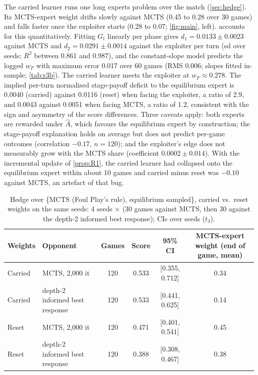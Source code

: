 \documentclass[10pt]{article}
\theoremstyle{plain}
\theoremstyle{definition}
\theoremstyle{remark}
\newcommand{\Ahat}{\hat A}
\begin{document}
The carried learner runs one long experts problem over the match (\cref{sec:hedge}). Its MCTS-expert weight drifts slowly against MCTS (0.45 to 0.28 over 30 games) and falls faster once the exploiter starts (0.28 to 0.07; \cref{fig:main}, left).  accounts for this quantitatively. Fitting $G_t$ linearly per phase gives $d_1=0.0133\pm0.0023$ against MCTS and $d_2=0.0291\pm0.0014$ against the exploiter per turn (sd over seeds; $R^2$ between 0.861 and 0.987), and the constant-slope model predicts the logged $w_F$ with maximum error 0.017 over 60 games (RMS 0.006; slopes fitted in-sample; \cref{tab:r3b}). The carried learner meets the exploiter at $w_F\approx0.278$. The implied per-turn normalised stage-payoff deficit to the equilibrium expert is 0.0040 (carried) against 0.0116 (reset) when facing the exploiter, a ratio of 2.9, and 0.0043 against 0.0051 when facing MCTS, a ratio of 1.2, consistent with the sign and asymmetry of the score differences. Three caveats apply: both experts are rewarded under $\Ahat$, which favours the equilibrium expert by construction; the stage-payoff explanation holds on average but does not predict per-game outcomes (correlation $-0.17$, $n=120$); and the exploiter's edge does not measurably grow with the MCTS share (coefficient $0.0002\pm0.014$). With the incremental update of \cref{prop:R1}, the carried learner had collapsed onto the equilibrium expert within about 10 games and carried minus reset was $-0.10$ against MCTS, an artefact of that bug.

\begin{table}[h]
\centering\small
\caption{Hedge over \{MCTS (Foul Play's rule), equilibrium sampled\}, carried vs.\ reset weights on the same seeds: 4 seeds $\times$ (30 games against MCTS, then 30 against the depth-2 informed best response); CIs over seeds ($t_3$).}
\label{tab:hedge}
\begin{tabular}{@{}llcccc@{}}
\toprule
Weights & Opponent & Games & Score & 95\% CI & MCTS-expert weight (end of game, mean) \\
\midrule
Carried & MCTS, 2,000 it & 120 & 0.533 & [0.355, 0.712] & 0.34 \\
Carried & depth-2 informed best response & 120 & 0.533 & [0.441, 0.625] & 0.14 \\
Reset & MCTS, 2,000 it & 120 & 0.471 & [0.401, 0.541] & 0.45 \\
Reset & depth-2 informed best response & 120 & 0.388 & [0.308, 0.467] & 0.38 \\
\bottomrule
\end{tabular}
\vspace{-0.6em}
\end{table}
\end{document}
